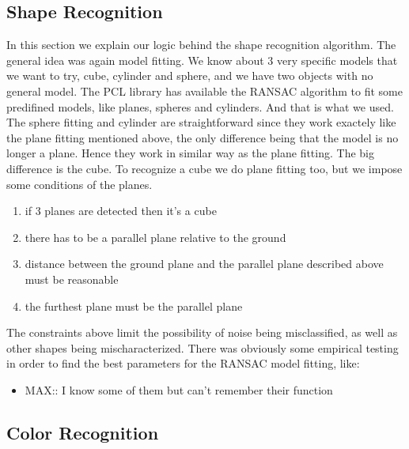 \subsection{Shape Recognition}

In this section we explain our logic behind the shape recognition algorithm.
The general idea was again model fitting.
We know about 3 very specific models that we want to try, cube, cylinder and sphere, and we have two objects with no general model.
The PCL library has available the RANSAC algorithm to fit some predifined models, like planes, spheres and cylinders. 
And that is what we used. 
The sphere fitting and cylinder are straightforward since they work exactely like the plane fitting mentioned above, the only difference being that the model is no longer a plane.
Hence they work in similar way as the plane fitting.
The big difference is the cube.
To recognize a cube we do plane fitting too, but we impose some conditions of the planes.

\begin{enumerate}
\item if 3 planes are detected then it's a cube
\item there has to be a parallel plane relative to the ground
\item distance between the ground plane and the parallel plane described above must be reasonable
\item the furthest plane must be the parallel plane
\end{enumerate}

The constraints above limit the possibility of noise being misclassified, as well as other shapes being mischaracterized.
There was obviously some empirical testing in order to find the best parameters for the RANSAC model fitting, like: 

\begin{itemize}
\item MAX:: I know some of them but can't remember their function
\end{itemize}


\subsection{Color Recognition}

